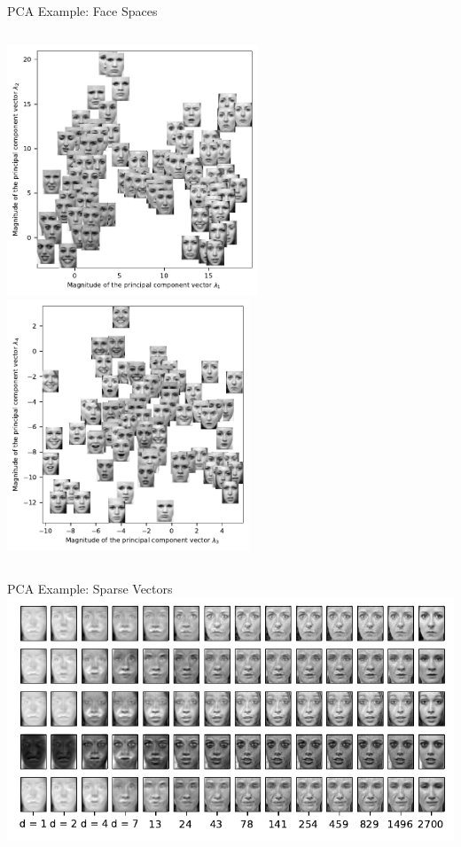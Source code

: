 \documentclass[handout,aspectratio=169]{beamer}
\begin{document}
	\begin{frame}{PCA Example: Face Spaces}
		\begin{columns}
			\centering
			\includegraphics[height=7.5cm]{media/eigenfaces_dim_0_1.pdf}
			\centering
			\includegraphics[height=7.5cm]{media/eigenfaces_dim_2_3.pdf}
		\end{columns}
	\end{frame}

	\begin{frame}{PCA Example: Sparse Vectors}
		\centering
		\includegraphics[width=\textwidth]{media/face_sparse.pdf}
	\end{frame}
\end{document}
